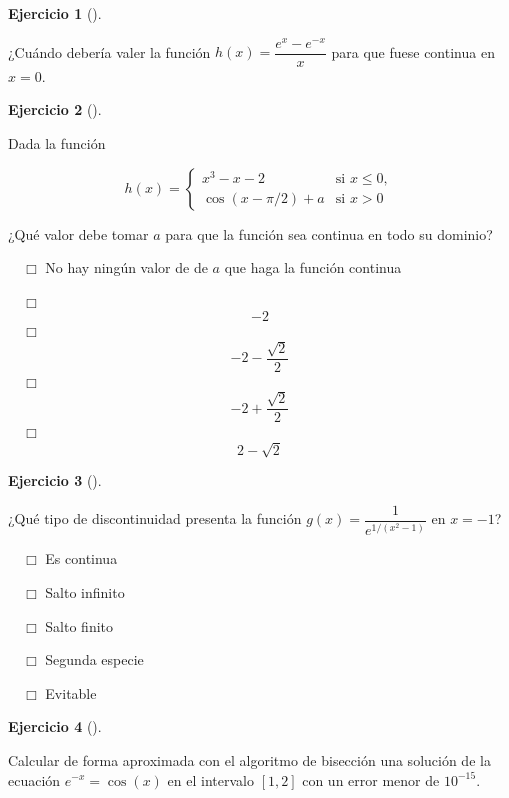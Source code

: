 \documentclass[
  a4paper,
]{scrreport}
\theoremstyle{definition}
\newtheorem{exercise}{Ejercicio}[chapter]
\theoremstyle{remark}
\begin{document}
\begin{exercise}[]\protect\hypertarget{exr-discontinuidad-evitable}{}\label{exr-discontinuidad-evitable}

¿Cuándo debería valer la función \(h(x)=\dfrac{e^x-e^{-x}}{x}\) para que
fuese continua en \(x=0\).

\vspace{18pt}

\end{exercise}

\begin{exercise}[]\protect\hypertarget{exr-continuidad-2}{}\label{exr-continuidad-2}

Dada la función

\[
h(x)=
\begin{cases}
x^3-x-2 & \mbox{si } x\leq 0,\\
\cos(x-\pi/2)+a & \mbox{si } x>0
\end{cases}
\]

¿Qué valor debe tomar \(a\) para que la función sea continua en todo su
dominio?

${\quad\Box}$ No hay ningún valor de de $a$ que haga la función continua

${\quad\Box}$ $$-2$$
${\quad\Box}$ $$-2 - \frac{\sqrt{2}}{2}$$
${\quad\Box}$ $$-2+\frac{\sqrt{2}}{2}$$
${\quad\Box}$ $$2-\sqrt{2}$$

\end{exercise}

\begin{exercise}[]\protect\hypertarget{exr-clasificacion-discontinuidad}{}\label{exr-clasificacion-discontinuidad}

¿Qué tipo de discontinuidad presenta la función
\(g(x)=\dfrac{1}{e^{1/(x^2-1)}}\) en \(x=-1\)?

${\quad\Box}$ Es continua

${\quad\Box}$ Salto infinito

${\quad\Box}$ Salto finito

${\quad\Box}$ Segunda especie

${\quad\Box}$ Evitable

\end{exercise}

\begin{exercise}[]\protect\hypertarget{exr-raices}{}\label{exr-raices}

Calcular de forma aproximada con el algoritmo de bisección una solución
de la ecuación \(e^{-x}=\cos(x)\) en el intervalo \([1,2]\) con un error
menor de \(10^{-15}\).

\vspace{18pt}

\end{exercise}
\end{document}
